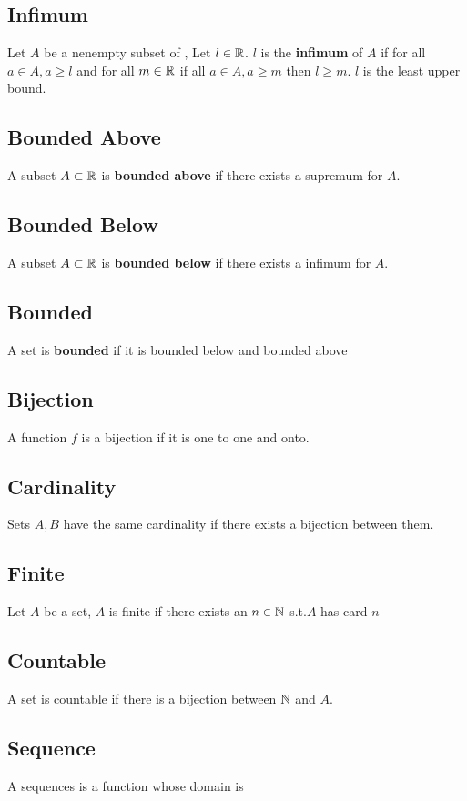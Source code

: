 \documentclass{article}
\begin{document}
\subsection{Infimum}
Let $A$ be a nenempty subset of \bR, Let $l \in \protect\mathbb{R}$. $l$ is the \textbf{infimum} of $A$ if for all $a \in A, a \ge l$ and for all $m \in \protect\mathbb{R}$ if all $a \in A, a \ge m$ then $l\ge m$. $l$ is the least upper bound.

\subsection{Bounded Above}
A subset $A \subset \protect\mathbb{R}$ is \textbf{bounded above} if there exists a supremum for $A$.
\subsection{Bounded Below}
A subset $A \subset \protect\mathbb{R}$ is \textbf{bounded below} if there exists a infimum for $A$.

\subsection{Bounded}
A set is \textbf{bounded} if it is bounded below and bounded above

\subsection{Bijection}
A function $f$ is a bijection if it is one to one and onto.

\subsection{Cardinality}
Sets $A,B$ have the same cardinality if there exists a bijection between them.

\subsection{Finite}
Let $A$ be a set, $A$ is finite if there exists an $n \in \protect\mathbb{N}$ s.t.$A$ has card $n$

\subsection{Countable}
A set is countable if there is a bijection between $\protect\mathbb{N}$ and $A$.

\subsection{Sequence}
A sequences is a function whose domain is \bN
\end{document}
